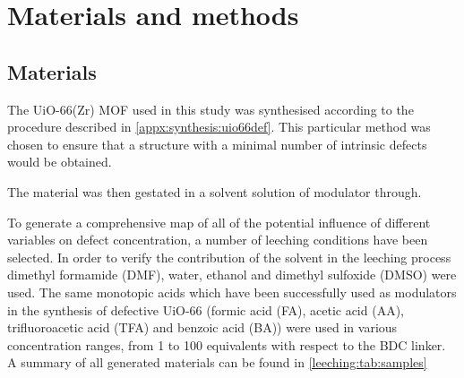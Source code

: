 
\section{Materials and methods}

\subsection{Materials}

The UiO-66(Zr) MOF used in this study was synthesised according
to the procedure described in \autoref{appx:synthesis:uio66def}.
This particular method was chosen to ensure that a structure with
a minimal number of intrinsic defects would be obtained.

The material was then gestated in a solvent solution of modulator
through.

To generate a comprehensive map of all of the potential influence
of different variables on defect concentration, a number of
leeching conditions have been selected. In order to verify the
contribution of the solvent in the leeching process
dimethyl formamide (DMF), water, ethanol and dimethyl sulfoxide (DMSO)
were used. The same monotopic acids which have been successfully used
as modulators in the synthesis of defective UiO-66
(formic acid (FA), acetic acid (AA), trifluoroacetic acid (TFA)
and benzoic acid (BA)) were used in various concentration ranges,
from 1 to 100 equivalents with respect to the BDC linker.
A summary of all generated materials can be found in
\autoref{leeching:tab:samples}

